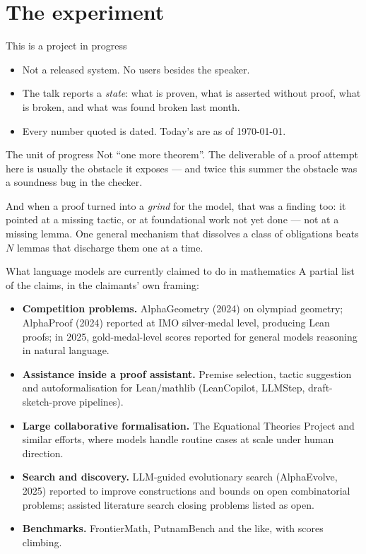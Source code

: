 \documentclass[11pt,aspectratio=169]{beamer}
\begin{document}
\section{The experiment}

\begin{frame}{This is a project in progress}
  \begin{itemize}
    \item Not a released system. No users besides the speaker.
    \item The talk reports a \emph{state}: what is proven, what is asserted
          without proof, what is broken, and what was found broken last month.
    \item Every number quoted is dated. Today's are as of \today.
  \end{itemize}
  \vfill
  \begin{block}{The unit of progress}
    Not ``one more theorem''. The deliverable of a proof attempt here is
    usually the obstacle it exposes --- and twice this summer the obstacle was
    a soundness bug in the checker.
  \end{block}
  \vfill
  And when a proof turned into a \emph{grind} for the model, that was a finding
  too: it pointed at a missing tactic, or at foundational work not yet done ---
  not at a missing lemma. One general mechanism that dissolves a class of
  obligations beats $N$ lemmas that discharge them one at a time.
\end{frame}

\begin{frame}{What language models are currently claimed to do in mathematics}
  A partial list of the claims, in the claimants' own framing:
  \vspace{1ex}
  \begin{itemize}
    \item \textbf{Competition problems.} AlphaGeometry (2024) on olympiad
          geometry; AlphaProof (2024) reported at IMO silver-medal level,
          producing Lean proofs; in 2025, gold-medal-level scores reported for
          general models reasoning in natural language.
    \item \textbf{Assistance inside a proof assistant.} Premise selection,
          tactic suggestion and autoformalisation for Lean/mathlib
          (LeanCopilot, LLMStep, draft-sketch-prove pipelines).
    \item \textbf{Large collaborative formalisation.} The Equational Theories
          Project and similar efforts, where models handle routine cases at
          scale under human direction.
    \item \textbf{Search and discovery.} LLM-guided evolutionary search
          (AlphaEvolve, 2025) reported to improve constructions and bounds on
          open combinatorial problems; assisted literature search closing
          problems listed as open.
    \item \textbf{Benchmarks.} FrontierMath, PutnamBench and the like, with
          scores climbing.
  \end{itemize}
\end{frame}
\end{document}
